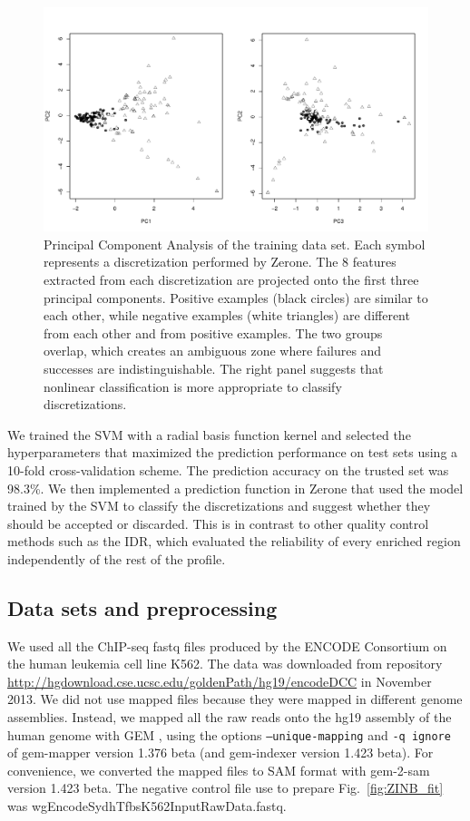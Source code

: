 \documentclass{bioinfo}
\begin{document}
\begin{methods}
\begin{figure}[!tpb]
\centerline{\includegraphics[scale=0.282]{pca_bw.pdf}}
\caption{
  Principal Component Analysis of the training data set.
  Each symbol represents a discretization performed by Zerone. The
  8 features extracted from each discretization are projected onto
  the first three principal components. Positive examples (black
  circles) are similar to each other, while negative examples (white
  triangles) are different from each other and from positive examples.
  The two groups overlap, which creates an ambiguous zone where
  failures and successes are indistinguishable. The right panel
  suggests that nonlinear classification is more appropriate to
  classify discretizations.
}\label{fig:pca_bw}
\end{figure}

We trained the SVM with a radial basis function kernel and
selected the hyperparameters that maximized the prediction
performance on test sets using a 10-fold cross-validation scheme.
The prediction accuracy on the trusted set was 98.3\%.
We then implemented a prediction function in Zerone that used the
model trained by the SVM to classify the discretizations and
suggest whether they should be accepted or discarded.
This is in contrast to other quality control methods such as the IDR, which
evaluated the reliability of every enriched region independently of the rest
of the profile.

\subsection{Data sets and preprocessing}
We used all the ChIP-seq fastq files produced by the ENCODE Consortium
on the human leukemia cell line K562. The data was
downloaded from repository
\href{http://hgdownload.cse.ucsc.edu/goldenPath/hg19/encodeDCC}{http://hgdownload.cse.ucsc.edu/goldenPath/hg19/encodeDCC} in November 2013.
We did not use mapped files because they were mapped in different
genome assemblies.
Instead, we mapped all the raw reads onto the
hg19 assembly of the human genome with GEM \citep{pmid23103880},
using the options \texttt{--unique-mapping} and \texttt{-q ignore} of
gem-mapper version 1.376 beta (and gem-indexer version 1.423 beta).
For convenience, we converted the mapped files to SAM format with
gem-2-sam version 1.423 beta.
The negative control file use to prepare Fig.~\ref{fig:ZINB_fit}
was wgEncodeSydhTfbsK562InputRawData.fastq.


\end{methods}
\end{document}
